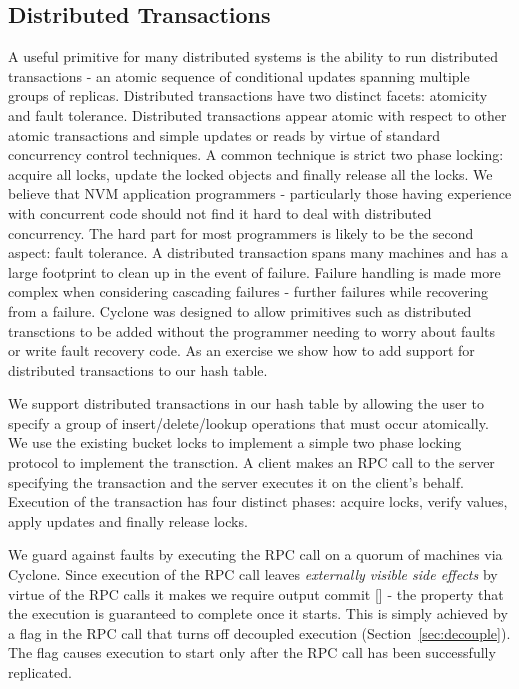 \documentclass[letterpaper,twocolumn,10pt]{article}
\begin{document}
\subsection{Distributed Transactions}
A useful primitive for many distributed systems is the ability to run
distributed transactions - an atomic sequence of conditional updates spanning
multiple groups of replicas. Distributed transactions have two distinct facets:
atomicity and fault tolerance. Distributed transactions appear atomic with
respect to other atomic transactions and simple updates or reads by virtue of
standard concurrency control techniques. A common technique is strict two phase
locking: acquire all locks, update the locked objects and finally release all
the locks. We believe that NVM application programmers - particularly those
having experience with concurrent code should not find it hard to deal with
distributed concurrency. The hard part for most programmers is likely to be the
second aspect: fault tolerance. A distributed transaction spans many machines
and has a large footprint to clean up in the event of failure. Failure handling
is made more complex when considering cascading failures - further failures
while recovering from a failure. Cyclone was designed to allow primitives such
as distributed transctions to be added without the programmer needing to worry
about faults or write fault recovery code. As an exercise we show how to add
support for distributed transactions to our hash table.

We support distributed transactions in our hash table by allowing the user to
specify a group of insert/delete/lookup operations that must occur
atomically. We use the existing bucket locks to implement a simple two phase
locking protocol to implement the transction. A client makes an RPC call to the
server specifying the transaction and the server executes it on the client's
behalf. Execution of the transaction has four distinct phases: acquire locks,
verify values, apply updates and finally release locks.

We guard against faults by executing the RPC call on a quorum of
machines via Cyclone. Since execution of the RPC call leaves \emph{externally
  visible side effects} by virtue of the RPC calls it makes we require output
commit [] - the property that the execution is guaranteed to complete once it
starts. This is simply achieved by a flag in the RPC call that turns off
decoupled execution (Section~\ref{sec:decouple}). The flag causes execution to
start only after the RPC call has been successfully replicated.
\end{document}
